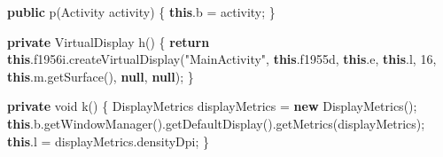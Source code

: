 \documentclass[
]{article}
\newenvironment{Shaded}{}{}
\newcommand{\ControlFlowTok}[1]{\textcolor[rgb]{0.00,0.44,0.13}{\textbf{#1}}}
\newcommand{\DataTypeTok}[1]{\textcolor[rgb]{0.56,0.13,0.00}{#1}}
\newcommand{\DecValTok}[1]{\textcolor[rgb]{0.25,0.63,0.44}{#1}}
\newcommand{\FunctionTok}[1]{\textcolor[rgb]{0.02,0.16,0.49}{#1}}
\newcommand{\KeywordTok}[1]{\textcolor[rgb]{0.00,0.44,0.13}{\textbf{#1}}}
\newcommand{\NormalTok}[1]{#1}
\newcommand{\OperatorTok}[1]{\textcolor[rgb]{0.40,0.40,0.40}{#1}}
\newcommand{\StringTok}[1]{\textcolor[rgb]{0.25,0.44,0.63}{#1}}
\begin{document}
\begin{Shaded}
\begin{Highlighting}[]
    \KeywordTok{public} \FunctionTok{p}\OperatorTok{(}\NormalTok{Activity activity}\OperatorTok{)} \OperatorTok{\{}
        \KeywordTok{this}\OperatorTok{.}\FunctionTok{b} \OperatorTok{=}\NormalTok{ activity}\OperatorTok{;}
    \OperatorTok{\}}

    \KeywordTok{private}\NormalTok{ VirtualDisplay }\FunctionTok{h}\OperatorTok{()} \OperatorTok{\{}
        \ControlFlowTok{return} \KeywordTok{this}\OperatorTok{.}\FunctionTok{f1956i}\OperatorTok{.}\FunctionTok{createVirtualDisplay}\OperatorTok{(}\StringTok{"MainActivity"}\OperatorTok{,} \KeywordTok{this}\OperatorTok{.}\FunctionTok{f1955d}\OperatorTok{,} \KeywordTok{this}\OperatorTok{.}\FunctionTok{e}\OperatorTok{,} \KeywordTok{this}\OperatorTok{.}\FunctionTok{l}\OperatorTok{,} \DecValTok{16}\OperatorTok{,} \KeywordTok{this}\OperatorTok{.}\FunctionTok{m}\OperatorTok{.}\FunctionTok{getSurface}\OperatorTok{(),} \KeywordTok{null}\OperatorTok{,} \KeywordTok{null}\OperatorTok{);}
    \OperatorTok{\}}

    \KeywordTok{private} \DataTypeTok{void} \FunctionTok{k}\OperatorTok{()} \OperatorTok{\{}
\NormalTok{        DisplayMetrics displayMetrics }\OperatorTok{=} \KeywordTok{new} \FunctionTok{DisplayMetrics}\OperatorTok{();}
        \KeywordTok{this}\OperatorTok{.}\FunctionTok{b}\OperatorTok{.}\FunctionTok{getWindowManager}\OperatorTok{().}\FunctionTok{getDefaultDisplay}\OperatorTok{().}\FunctionTok{getMetrics}\OperatorTok{(}\NormalTok{displayMetrics}\OperatorTok{);}
        \KeywordTok{this}\OperatorTok{.}\FunctionTok{l} \OperatorTok{=}\NormalTok{ displayMetrics}\OperatorTok{.}\FunctionTok{densityDpi}\OperatorTok{;}
    \OperatorTok{\}}


\end{Highlighting}
\end{Shaded}
\end{document}
